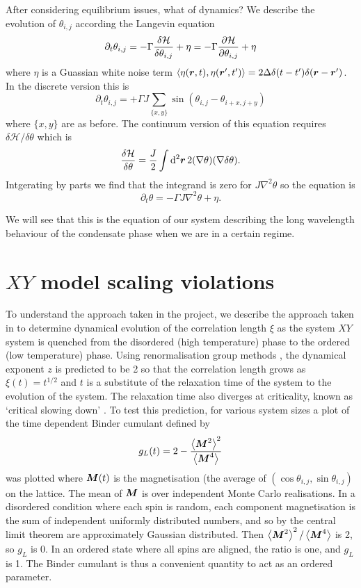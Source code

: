 After considering equilibrium issues, what of dynamics? We describe \cite{2016PhRvB..94j4521S} the evolution of $\theta_{i,j}$ according the Langevin equation 
\[
\partial_t \theta_{i,j} = -\Gamma \frac{\delta \mathcal{H}}{\delta \theta_{i,j}} + \eta=-\Gamma \pdv{\mathcal{H}}{\theta_{i,j}} + \eta
\]
where $\eta$ is a Guassian white noise term $\left < \eta(\boldsymbol{r},t), \eta(\boldsymbol{r}',t') \right > = 2 \Delta \delta(t-t')\delta(\boldsymbol{r}-\boldsymbol{r}')$. In the discrete version this is
\[
\partial_t \theta_{i,j} = +\Gamma J \sum_{\{x,y\}} \sin(\theta_{i,j} -\theta_{i+x,j+y})
\]
where $\{x,y\}$ are as before. The continuum version of this equation requires $\delta \mathcal{H} / \delta \theta$ which is 
\[
\frac{\delta \mathcal{H}}{\delta \theta} = \frac{J}{2} \int \dd[2]{\boldsymbol{r}}  2 (\nabla \theta)(\nabla \delta \theta).
\]
Intgerating by parts we find that the integrand is zero for $J\nabla^2 \theta$ so the equation is 
\[
\partial_t \theta = -\Gamma J \nabla^2 \theta + \eta.
\]

We will see that this is the equation of our system describing the long wavelength behaviour of the condensate phase when we are in a certain regime.

\section{$XY$ model scaling violations}

To understand the approach taken in the project, we describe the approach taken in \cite{PhysRevLett.84.1503} to determine dynamical evolution of the correlation length $\xi$ as the system $XY$ system is quenched from the disordered (high temperature) phase to the ordered (low temperature) phase. Using renormalisation group methods \cite{Janssen1989}, the dynamical exponent $z$ is predicted to be 2 so that the correlation length grows as $\xi(t) = t^{1/2}$ and $t$ is a substitute of the relaxation time of the system to the evolution of the system. The relaxation time also diverges at criticality, known as `critical slowing down' \cite{nishimori2011elements}. 
To test this prediction, for various system sizes a plot of the time dependent Binder cumulant defined by 
\[
g_L(t) = 2 - \frac{\left < \boldsymbol{M}^2 \right >^2}{\left < \boldsymbol{M}^4 \right >}
\]
was plotted where $\boldsymbol{M}(t)$ is the magnetisation (the average of $(\cos \theta_{i,j},\sin\theta_{i,j})$ on the lattice. The mean of $\boldsymbol{M}$ is over independent Monte Carlo realisations. In a disordered condition where each spin is random, each component magnetisation is the sum of independent uniformly distributed numbers, and so by the central limit theorem are approximately Gaussian distributed. Then $\left < \boldsymbol{M}^2 \right >^2/\left < \boldsymbol{M}^4 \right >$ is 2, so $g_L$ is 0. In an ordered state where all spins are aligned, the ratio is one, and $g_L$ is 1. The Binder cumulant is thus a convenient quantity to act as an ordered parameter.

